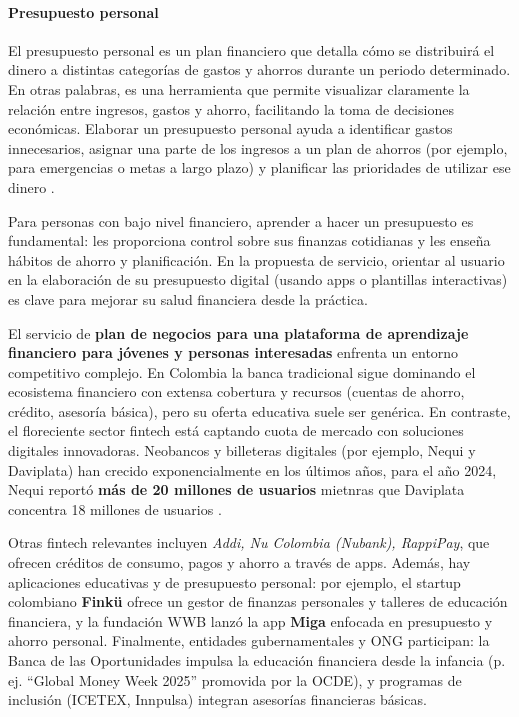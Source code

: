 \paragraph*{Presupuesto personal}
El presupuesto personal es un plan financiero que detalla cómo se distribuirá el dinero a distintas categorías de gastos y ahorros durante un periodo determinado. En otras palabras, es una herramienta que permite visualizar claramente la relación entre ingresos, gastos y ahorro, facilitando la toma de decisiones económicas. Elaborar un presupuesto personal ayuda a identificar gastos innecesarios, asignar una parte de los ingresos a un plan de ahorros (por ejemplo, para emergencias o metas a largo plazo) y planificar las prioridades de utilizar ese dinero \parencite{GrupoR01}. 

Para personas con bajo nivel financiero, aprender a hacer un presupuesto es fundamental: les proporciona control sobre sus finanzas cotidianas y les enseña hábitos de ahorro y planificación. En la propuesta de servicio, orientar al usuario en la elaboración de su presupuesto digital (usando apps o plantillas interactivas) es clave para mejorar su salud financiera desde la práctica.

El servicio de \textbf{plan de negocios para una plataforma de aprendizaje financiero para jóvenes y personas interesadas} enfrenta un entorno competitivo complejo. En Colombia la banca tradicional sigue dominando el ecosistema financiero con extensa cobertura y recursos (cuentas de ahorro, crédito, asesoría básica), pero su oferta educativa suele ser genérica. En contraste, el floreciente sector fintech está captando cuota de mercado con soluciones digitales innovadoras. Neobancos y billeteras digitales (por ejemplo, Nequi y Daviplata) han crecido exponencialmente en los últimos años, para el año 2024, Nequi reportó \textbf{más de 20 millones de usuarios} mietnras que Daviplata concentra 18 millones de usuarios \parencite{Pulzo01}. 

Otras fintech relevantes incluyen \textit{Addi, Nu Colombia (Nubank), RappiPay}, que ofrecen créditos de consumo, pagos y ahorro a través de apps. Además, hay aplicaciones educativas y de presupuesto personal: por ejemplo, el startup colombiano \textbf{Finkü} ofrece un gestor de finanzas personales y talleres de educación financiera, y la fundación WWB lanzó la app \textbf{Miga} enfocada en presupuesto y ahorro personal. Finalmente, entidades gubernamentales y ONG participan: la Banca de las Oportunidades impulsa la educación financiera desde la infancia (p. ej. “Global Money Week 2025” promovida por la OCDE), y programas de inclusión (ICETEX, Innpulsa) integran asesorías financieras básicas.

